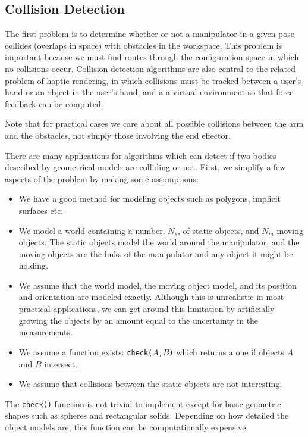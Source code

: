 \subsection{Collision Detection}

The first problem is to determine whether or not a manipulator in a given pose collides (overlaps in space) with   obstacles in the workspace.   This problem is important because we must find routes through the configuration space in which no collisions occur.  Collision detection algorithms are also central to the related problem of haptic rendering, in which  collisions must be tracked between a user's hand or an object in the user's hand, and a a virtual environment so that force feedback can be computed. 


Note that for practical cases we care about all possible collisions between the arm and the obstacles, not simply those involving the end effector. 


There are many applications for algorithms which can detect if two bodies described by geometrical models are colliding or not.   First, we simplify a few aspects of the problem by making some assumptions:
\begin{itemize}
\item We have a good method for modeling objects such as polygons, implicit surfaces etc. 
\item We model a world containing a number. $N_s$, of static objects, and $N_m$ moving objects.  The static objects model the world around the manipulator, and the moving objects are the links of the manipulator and any object it might be holding. 
\item We assume that the world model, the moving object model, and its position and orientation are modeled exactly.   Although this is unrealistic in most practical applications, we can get around this limitation by artificially growing the objects by an amount equal to the uncertainty in the measurements.
\item We assume a function exists: {\tt check($A$,$B$)} which returns a one if objects $A$ and $B$ intersect.
\item We assume that collisions between the static objects are not interesting. 
\end{itemize}

The {\tt check()} function is not trivial to implement except for basic geometric shapes such as spheres and rectangular solids.  Depending on how detailed the object models are, this function can be computationally expensive. 

